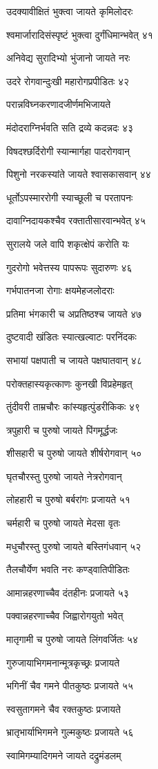 उदक्यावीक्षितं भुक्त्वा जायते कृमिलोदरः

श्वमार्जारादिसंस्पृष्टं भुक्त्वा दुर्गंधिमान्भवेत् ४१

अनिवेद्य सुरादिभ्यो भुंजानो जायते नरः

उदरे रोगवान्दुःखी महारोगप्रपीडितः ४२

परान्नविघ्नकरणादजीर्णमभिजायते

मंदोदराग्निर्भवति सति द्रव्ये कदन्नदः ४३

विषदश्छर्दिरोगी स्यान्मार्गहा पादरोगवान्

पिशुनो नरकस्यांते जायते श्वासकासवान् ४४

धूर्तोऽपस्माररोगी स्याच्छूली च परतापनः

दावाग्निदायकश्चैव रक्तातीसारवान्भवेत् ४५

सुरालये जले वापि शकृत्क्षेपं करोति यः

गुदरोगो भवेत्तस्य पापरूपः सुदारुणः ४६

गर्भपातनजा रोगाः क्षयमेहजलोदराः

प्रतिमा भंगकारी च अप्रतिष्ठश्च जायते ४७

दुष्टवादी खंडितः स्यात्खल्वाटः परनिंदकः

सभायां पक्षपाती च जायते पक्षघातवान् ४८

परोक्तहास्यकृत्काणः कुनखी विप्रहेमहृत्

तुंदीवरी ताम्रचौरः कांस्यहृत्पुंडरीकिकः ४९

त्रपुहारी च पुरुषो जायते पिंगमूर्द्धजः

शीसहारी च पुरुषो जायते शीर्षरोगवान् ५०

घृतचौरस्तु पुरुषो जायते नेत्ररोगवान्

लोहहारी च पुरुषो बर्बरांगः प्रजायते ५१

चर्महारी च पुरुषो जायते मेदसा वृतः

मधुचौरस्तु पुरुषो जायते बस्तिगंधवान् ५२

तैलचौर्येण भवति नरः कण्ड्वातिपीडितः

आमान्नहरणाच्चैव दंतहीनः प्रजायते ५३

पक्वान्नहरणाच्चैव जिह्वारोगयुतो भवेत्

मातृगामी च पुरुषो जायते लिंगवर्जितः ५४

गुरुजायाभिगमनान्मूत्रकृच्छ्रः प्रजायते

भगिनीं चैव गमने पीतकुष्ठः प्रजायते ५५

स्वसुतागमने चैव रक्तकुष्ठः प्रजायते

भ्रातृभार्याभिगमने गुल्मकुष्ठः प्रजायते ५६

स्वामिगम्यादिगमने जायते दद्रुमंडलम्

